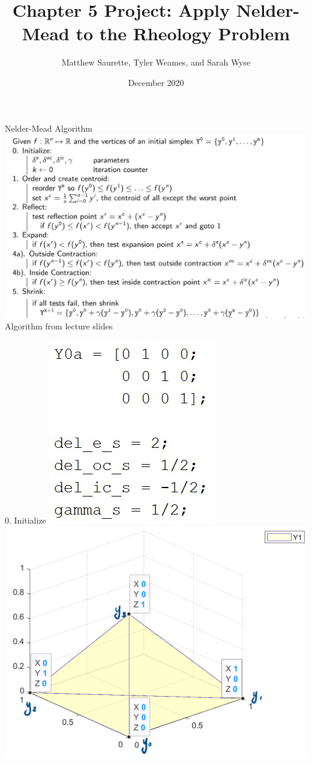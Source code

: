 \documentclass{beamer}
\title[Nelder-Mead on the Rhology Problem]{Chapter 5 Project: Apply Nelder-Mead to the Rheology Problem}
\author[Matthew, Tyler, and Sarah]{Matthew Saurette, Tyler Weames, and Sarah Wyse}
\institute[Math 462]{Math 462\\ University of British Columbia - Okanagan}
\date{December 2020}
\begin{document}
\maketitle

\begin{frame}{Nelder-Mead Algorithm}
    \centering
    \includegraphics[width=0.95\linewidth]{NMAlgorithm}\\
    \tiny
	\hfill Algorithm from lecture slides    
\end{frame}

\begin{frame}{0. Initialize}
	\centering
	\includegraphics[width=0.45\linewidth]{Initialize}
	\includegraphics[width=0.45\linewidth]{InitializeFig}
\end{frame}
\end{document}
